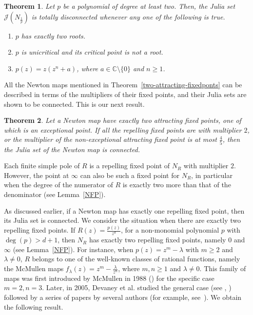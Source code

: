 \documentclass[12pt]{article}
\newtheorem{maintheorem}{Theorem}
\numberwithin{equation}{section}
\begin{document}
 \begin{maintheorem}\label{diconnected_gen}
Let $p$ be a polynomial of degree at least two. Then, the Julia set $\mathcal{J}(N_{\frac{1}{p}})$ is totally disconnected whenever any one of the following is true.
\begin{enumerate}
  \item $p$ has exactly two roots.
  \item $p$ is unicritical and its critical point is not a root.
  \item $p(z)=z(z^n+a)$, where $a\in \mathbb{C}\setminus \{0\}$ and $n \geq 1$.
\end{enumerate}
\end{maintheorem}
All the Newton maps mentioned in Theorem~\ref{two-attracting-fixedponts} can be described in terms of the multipliers of their fixed points, and their Julia sets are shown to be connected. This is our next result.
\begin{maintheorem}
	Let a Newton map have exactly two attracting fixed points, one of which is an exceptional point. If all the repelling fixed points are with multiplier $2$, or the multiplier of the non-exceptional attracting fixed point is at most $\frac{4}{5}$, then the Julia set of the Newton map is connected.
	\label{connected-JS}
\end{maintheorem}
Each finite simple pole of $R$ is a repelling fixed point of $N_R$ with multiplier $2$. However, the point at $\infty$ can also be such a fixed point for $N_R$, in particular when the degree of the numerator of $R$ is exactly two more than that of the denominator (see Lemma~\ref{NFP}).
\par 
 As discussed earlier, if a Newton map has exactly one repelling fixed point, then its Julia set is connected. We consider the situation when there are exactly two repelling fixed points. If $R(z) = \frac{p(z)}{z^d}$, for a non-monomial polynomial $p$ with $\deg(p) > d + 1$, then $N_R$ has exactly two repelling fixed points, namely $0$ and $\infty$ (see Lemma~\ref{NFP}). For instance, when $p(z) = z^m - \lambda$ with $m \geq 2$ and $\lambda \neq 0$, $R$ belongs to one of the well-known classes of rational functions, namely the McMullen maps $f_\lambda(z)=z^m-\frac{\lambda}{z^n}$, where $m,n  \geq 1$ and $\lambda \neq 0$. 
 This family of maps was first introduced by McMullen in 1988 (\cite{McMullen1998}) for the specific case $m=2, n=3$. Later, in 2005, Devaney et al. studied the general case (see \cite{DevaneyLook2005}, \cite{Devaney2005}) followed by a series of papers by several authors (for example, see~\cite{QWY2012}). We obtain the following result.
\end{document}
